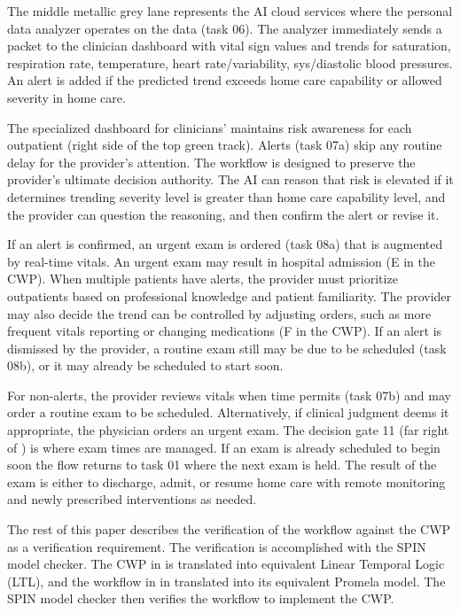 The middle metallic grey lane represents the AI cloud services where the personal data analyzer operates on the data (task 06).  The analyzer immediately sends a packet to the clinician dashboard with vital sign values and trends for saturation, respiration rate, temperature, heart rate/variability, sys/diastolic blood pressures. An alert is added if the predicted trend exceeds home care capability or allowed severity in home care.

The specialized dashboard for clinicians’ maintains risk awareness for each outpatient (right side of the top green track). Alerts (task 07a) skip any routine delay for the provider’s attention. The workflow is designed to preserve the provider’s ultimate decision authority. The AI can reason that risk is elevated if it determines trending severity level is greater than home care capability level, and the provider can question the reasoning, and then confirm the alert or revise it. 

If an alert is confirmed, an urgent exam is ordered (task 08a) that is augmented by real-time vitals. An urgent exam may result in hospital admission (E in the CWP). When multiple patients have alerts, the provider must prioritize outpatients based on professional knowledge and patient familiarity. The provider may also decide the trend can be controlled by adjusting orders, such as more frequent vitals reporting or changing medications (F in the CWP). If an alert is dismissed by the provider, a routine exam still may be due to be scheduled (task 08b), or it may already be scheduled to start soon. 

For non-alerts, the provider reviews vitals when time permits (task 07b) and may order a routine exam to be scheduled. Alternatively, if clinical judgment deems it appropriate, the physician orders an urgent exam.
The decision gate 11 (far right of ) is where exam times are managed. If an exam is already scheduled to begin soon the flow returns to task 01 where the next exam is held. The result of the exam is either to discharge, admit, or resume home care with remote monitoring and newly prescribed interventions as needed.

The rest of this paper describes the verification of the workflow against the CWP as a verification requirement. The verification is accomplished with the SPIN model checker. The CWP in  is translated into equivalent Linear Temporal Logic (LTL), and the workflow in  in translated into its equivalent Promela model. The SPIN model checker then verifies the workflow to implement the CWP.
